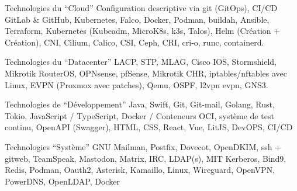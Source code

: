 
\begin{cvskills}

  \cvskill
    {Technologies du ``Cloud''}
    {
      Configuration descriptive via git (GitOps), CI/CD GitLab \& GitHub, \break
      Kubernetes, Falco, Docker, Podman, buildah, Ansible, Terraform, Kubernetes \break
      (Kubeadm, MicroK8s, k3s, Talos), Helm (Création + Création), \break 
      CNI, Cilium, Calico, CSI, Ceph, CRI, cri-o, runc, containerd.
    }

    \cvskill
    {Technologies du ``Datacenter''}
    {
      LACP, STP, MLAG, Cisco IOS, Stormshield, Mikrotik RouterOS, OPNsense, \break
      pfSense, Mikrotik CHR, iptables/nftables avec Linux, \break 
      EVPN (Proxmox avec patches), Qemu, OSPF, l2vpn evpn, GNS3.
    }

    \cvskill
    {Technologies de ``Développement''}
    {
      Java, Swift, Git, Git-mail, Golang, Rust, Tokio, JavaScript / TypeScript, \break 
      Docker / Conteneurs OCI, système de test continu, OpenAPI (Swagger), HTML, \break
      CSS, React, Vue, LitJS, DevOPS, CI/CD
    }

    \cvskill
    {Technologies ``Système''}
    {
      GNU Mailman, Postfix, Dovecot, OpenDKIM, ssh + gitweb, TeamSpeak, \break
       Mastodon, Matrix, IRC, LDAP(s), MIT Kerberos, Bind9, Redis, Podman, \break
       Oauth2, Asterisk, Kamaillo, Linux, Wireguard, OpenVPN, PowerDNS, \break
        OpenLDAP, Docker
    }

\end{cvskills}
